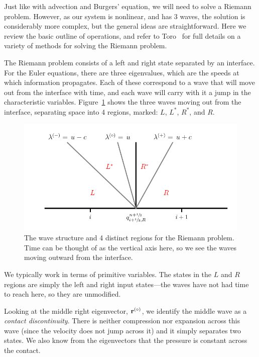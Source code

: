 Just like with advection and Burgers' equation, we will need to solve
a Riemann problem.  However, as our system is nonlinear, and has 3
waves, the solution is considerably more complex, but the general
ideas are straightforward.  Here we review the basic outline of
operations, and refer to Toro~\cite{toro:1997} for full details on a
variety of methods for solving the Riemann problem.

The Riemann problem consists of a left and right state separated by an
interface.  For the Euler equations, there are three eigenvalues,
which are the speeds at which information propagates.  Each of these
correspond to a wave that will move out from the interface with time,
and each wave will carry with it a jump in the characteristic
variables.  Figure~\ref{fig:riemann:waves} shows the
three waves moving out from the interface, separating space into 4
regions, marked: $L$, $L^*$, $R^*$, and $R$.
\begin{figure}[h]
\centering
\includegraphics[width=\linewidth]{riemann-waves}
\caption[The Riemann problem wave structure for the Euler
  equations]{\label{fig:riemann:waves} The wave structure and 4
  distinct regions for the Riemann problem.  Time can be thought of as
  the vertical axis here, so we see the waves moving outward from the
  interface.}
\end{figure}
We typically work in terms of primitive variables.  The states in the
$L$ and $R$ regions are simply the left and right input states---the
waves have not had time to reach here, so they are unmodified.

Looking at the middle right eigenvector, ${\bf r}^{(\circ)}$, we identify the
middle wave as a {\em contact discontinuity}.  There is neither
compression nor expansion across this wave (since the velocity does
not jump across it) and it simply separates two states.  We also know
from the eigenvectors that the pressure is constant across the
contact.

